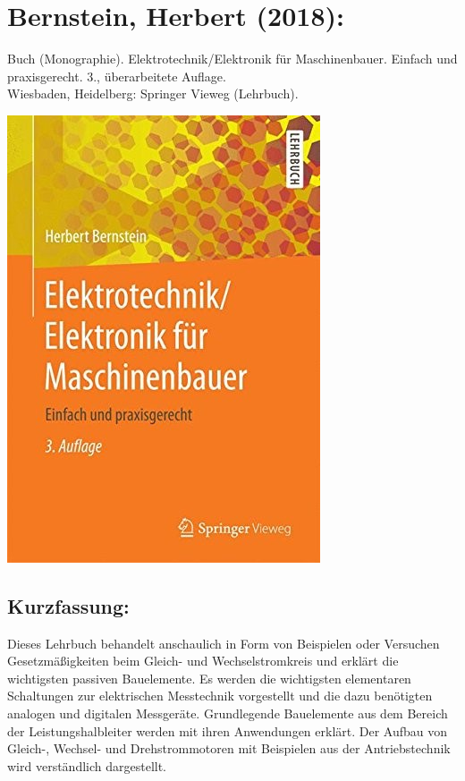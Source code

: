 \section*{Bernstein, Herbert (2018):}
Buch (Monographie). Elektrotechnik/Elektronik für Maschinenbauer. Einfach und praxisgerecht. 3., überarbeitete Auflage. \\Wiesbaden, Heidelberg: Springer Vieweg (Lehrbuch).\\
\begin{minipage}{0.5\textwidth}
	\includegraphics[width=\linewidth]{../Appendix/Literaturverzeichnis/img/Bernstein.jpg}
\end{minipage}
\hfill
\begin{minipage}{0.48\textwidth}
\subsection*{Kurzfassung:}
Dieses Lehrbuch behandelt anschaulich in Form von Beispielen oder Versuchen Gesetzmäßigkeiten beim Gleich- und Wechselstromkreis und erklärt die wichtigsten passiven Bauelemente. Es werden die wichtigsten elementaren Schaltungen zur elektrischen Messtechnik vorgestellt und die dazu benötigten analogen und digitalen Messgeräte. Grundlegende Bauelemente aus dem Bereich der Leistungshalbleiter werden mit ihren Anwendungen erklärt. Der Aufbau von Gleich-, Wechsel- und Drehstrommotoren mit Beispielen aus der Antriebstechnik wird verständlich dargestellt.
\end{minipage}
